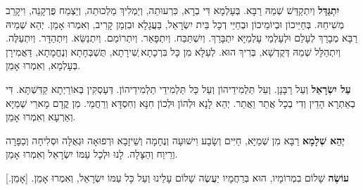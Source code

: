 
\textbf{יִתְגַּדַּל} וְיִתְקַדַּשׁ שְׁמֵהּ רַבָּא.  בְּעָלְמָא דִּי בְרָא, כִּרְעוּתֵה, וְיַמְלִיךְ מַלְכוּתֵה, וְיַצְמַח פֻּרְקָנֵה, וִיקָרֵב מְשִׁיחֵהּ.  בְּחַיֵּיכוֹן וּבְיוֹמֵיכוֹן וּבְחַיֵּי דְכָל בֵּית יִשְׂרָאֵל, בַּעֲגָלָא וּבִזְמַן קָרִיב, וְאִמְרוּ אָמֵן.  יְהֵא שְׁמֵיהּ רַבָּא מְבָרַךְ לְעָלַם וּלְעָלְמֵי עָלְמַיָּא יִתְבָּרַךְ. וְיִשְׁתַּבַּח. וְיִתְפָּאַר. וְיִתְרוֹמַם. וְיִתְנַשֵּׂא. וְיִתְהַדָּר. וְיִתְעַלֶּה. וְיִתְהַלָּל שְׁמֵהּ דְּקֻדְשָׁא, בְּרִיךְ הוּא.  לְעֵלָּא מִן כָּל בִּרְכָתָא ְשִׁירָתָא, תֻּשְׁבְּחָתָא וְנֶחֱמָתָא, דַּאֲמִירָן בְּעָלְמָא, וְאִמְרוּ אָמֵן. 

\textbf{עַל יִשְׂרָאֵל} וְעַל רַבָּנָן. וְעַל תַּלְמִידֵיהוֹן וְעַל כָּל תַּלְמִידֵי תַלְמִידֵיהוֹן. דְּעָסְקִין בְּאוֹרַיְתָא קַדִּשְׁתָּא. דִּי בְאַתְרָא הָדֵין וְדִי בְכָל אֲתַר וַאֲתַר. יְהֵא לָנָא וּלְהוֹן וּלְכוֹן חִנָּא וְחִסְדָּא וְרַחֲמֵי. מִן קֳדָם מָארֵי שְׁמַיָּא וְאַרְעָא וְאִמְרוּ אָמֵן. 

\textbf{יְהֵא שְׁלָמָא} רַבָּא מִן שְׁמַיָּא, חַיִּים וְשָׂבָע וִישׁוּעָה וְנֶחָמָה וְשֵׁיזָבָא וּרְפוּאָה וּגְאֻלָּה וּסְלִיחָה וְכַפָּרָה וְרֵיוַח וְהַצָּלָה. לָנוּ וּלְכָל עַמּוֹ יִשְׂרָאֵל וְאִמְרוּ אָמֵן. 

\textbf{עוֹשֶׂה} שָׁלוֹם בִמְרוֹמָיו, הוּא בְּרַחֲמָיו יַעֲשֶׂה שָׁלוֹם עָלֵינוּ וְעַל כָּל עַמּוֹ יִשְׂרָאֵל, וְאִמְרוּ אָמֵן. [אָמֵן.]
